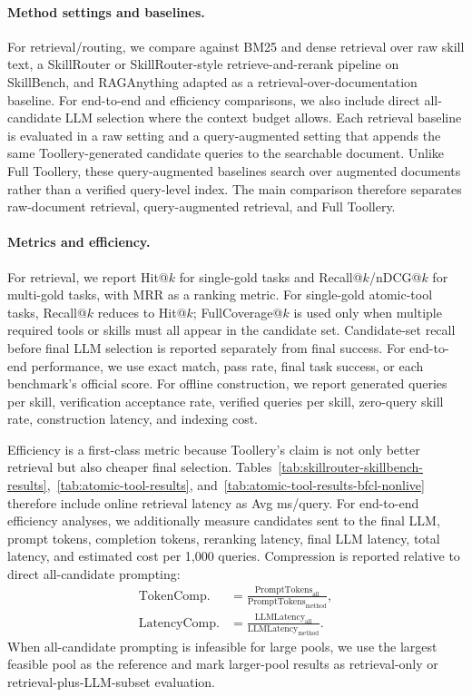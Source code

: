 \documentclass[11pt]{article}
\begin{document}
\paragraph{Method settings and baselines.}
For retrieval/routing, we compare against BM25 and dense retrieval over raw skill text, a SkillRouter or SkillRouter-style retrieve-and-rerank pipeline on SkillBench, and RAGAnything adapted as a retrieval-over-documentation baseline. For end-to-end and efficiency comparisons, we also include direct all-candidate LLM selection where the context budget allows. Each retrieval baseline is evaluated in a raw setting and a query-augmented setting that appends the same Toollery-generated candidate queries to the searchable document. Unlike Full Toollery, these query-augmented baselines search over augmented documents rather than a verified query-level index. The main comparison therefore separates raw-document retrieval, query-augmented retrieval, and Full Toollery.

\paragraph{Metrics and efficiency.}
For retrieval, we report Hit@$k$ for single-gold tasks and Recall@$k$/nDCG@$k$ for multi-gold tasks, with MRR as a ranking metric. For single-gold atomic-tool tasks, Recall@$k$ reduces to Hit@$k$; FullCoverage@$k$ is used only when multiple required tools or skills must all appear in the candidate set. Candidate-set recall before final LLM selection is reported separately from final success. For end-to-end performance, we use exact match, pass rate, final task success, or each benchmark's official score. For offline construction, we report generated queries per skill, verification acceptance rate, verified queries per skill, zero-query skill rate, construction latency, and indexing cost.

Efficiency is a first-class metric because Toollery's claim is not only better retrieval but also cheaper final selection. Tables~\ref{tab:skillrouter-skillbench-results},~\ref{tab:atomic-tool-results}, and~\ref{tab:atomic-tool-results-bfcl-nonlive} therefore include online retrieval latency as Avg ms/query. For end-to-end efficiency analyses, we additionally measure candidates sent to the final LLM, prompt tokens, completion tokens, reranking latency, final LLM latency, total latency, and estimated cost per 1,000 queries. Compression is reported relative to direct all-candidate prompting:
\begin{align}
\mathrm{TokenComp.}
&= \frac{\mathrm{PromptTokens}_{\mathrm{all}}}
{\mathrm{PromptTokens}_{\mathrm{method}}}, \\
\mathrm{LatencyComp.}
&= \frac{\mathrm{LLMLatency}_{\mathrm{all}}}
{\mathrm{LLMLatency}_{\mathrm{method}}}.
\end{align}
When all-candidate prompting is infeasible for large pools, we use the largest feasible pool as the reference and mark larger-pool results as retrieval-only or retrieval-plus-LLM-subset evaluation.
\end{document}
